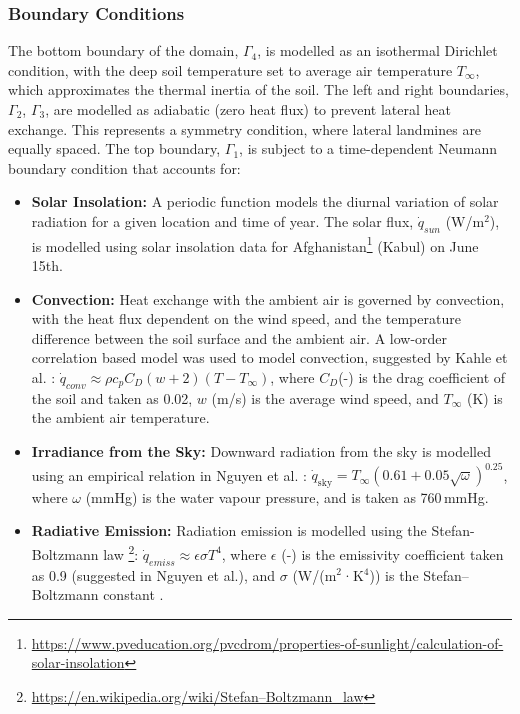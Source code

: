     \subsubsection{Boundary Conditions} 
    
        The bottom boundary of the domain, $\Gamma_4$, is modelled as an isothermal Dirichlet condition, with the deep soil temperature set to average air temperature $T_{\infty}$, which approximates the thermal inertia of the soil. The left and right boundaries, $\Gamma_2$, $\Gamma_3$,  are modelled as adiabatic (zero heat flux) to prevent lateral heat exchange. This represents a symmetry condition, where lateral landmines are equally spaced. The top boundary, $\Gamma_1$,  is subject to a time-dependent Neumann boundary condition that accounts for:
    
        \begin{itemize}
        
            \item \textbf{Solar Insolation:} A periodic function models the diurnal variation of solar radiation for a given location and time of year. The solar flux,  $\dot{q}_{sun}$  (W/m$^2$), is modelled using solar insolation data for Afghanistan\footnote{\url{https://www.pveducation.org/pvcdrom/properties-of-sunlight/calculation-of-solar-insolation}} (Kabul) on June 15th.
            
            \item \textbf{Convection:} Heat exchange with the ambient air is governed by convection, with the heat flux dependent on the wind speed, and the temperature difference between the soil surface and the ambient air. A low-order correlation based model was used to model convection, suggested by Kahle et al. \cite{kahle1997model}: $\dot{q}_{conv} \approx \rho c_p C_D(w+2)(T - T_{\infty})$, where \(C_D\)(-) is the drag coefficient of the soil and taken as 0.02, \(w\) (m/s) is the average wind speed, and \(T_\infty\) (K) is the ambient air temperature.
            
            \item \textbf{Irradiance from the Sky:} Downward radiation from the sky is modelled using an empirical relation in Nguyen et al. \cite{nguyen2008inverse}: $\dot{q}_{\text{sky}} = T_{\infty} \left( 0.61 + 0.05 \sqrt{\omega} \right)^{0.25}$, where \(\omega\) (mmHg) is the water vapour pressure, and is taken as 760\,mmHg.
            
            \item \textbf{Radiative Emission:} Radiation emission is modelled using the Stefan-Boltzmann law \footnote{\url{https://en.wikipedia.org/wiki/Stefan–Boltzmann_law}}: $\dot{q}_{emiss} \approx \epsilon \sigma T^4$, where \(\epsilon\) (-) is the emissivity coefficient taken as 0.9 (suggested in Nguyen et al.), and \(\sigma\) (W/(m$^2$·K$^4$)) is the Stefan–Boltzmann constant .
            
        \end{itemize}
    
